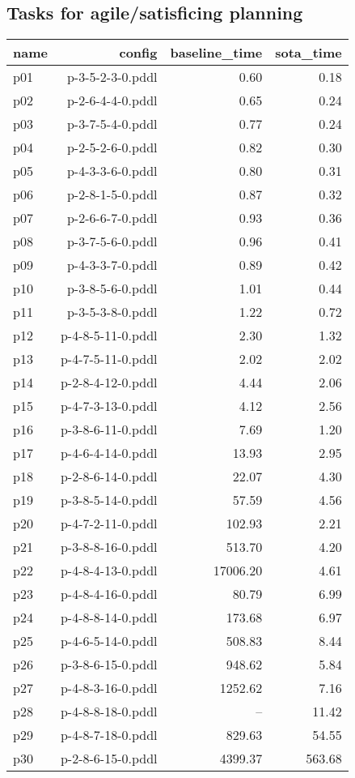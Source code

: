 \documentclass{article}
\begin{document}
                    \subsection*{Tasks for agile/satisficing planning}
                    
                            \begin{center}
                            \scriptsize
                            \begin{tabular}{@{}l|r|r|r@{}}
                            name & config & baseline\_time & sota\_time\\\midrule
                              p01& p-3-5-2-3-0.pddl&0.60&0.18\\
  p02& p-2-6-4-4-0.pddl&0.65&0.24\\
  p03& p-3-7-5-4-0.pddl&0.77&0.24\\
  p04& p-2-5-2-6-0.pddl&0.82&0.30\\
  p05& p-4-3-3-6-0.pddl&0.80&0.31\\
  p06& p-2-8-1-5-0.pddl&0.87&0.32\\
  p07& p-2-6-6-7-0.pddl&0.93&0.36\\
  p08& p-3-7-5-6-0.pddl&0.96&0.41\\
  p09& p-4-3-3-7-0.pddl&0.89&0.42\\
  p10& p-3-8-5-6-0.pddl&1.01&0.44\\
  p11& p-3-5-3-8-0.pddl&1.22&0.72\\
  p12& p-4-8-5-11-0.pddl&2.30&1.32\\
  p13& p-4-7-5-11-0.pddl&2.02&2.02\\
  p14& p-2-8-4-12-0.pddl&4.44&2.06\\
  p15& p-4-7-3-13-0.pddl&4.12&2.56\\
  p16& p-3-8-6-11-0.pddl&7.69&1.20\\
  p17& p-4-6-4-14-0.pddl&13.93&2.95\\
  p18& p-2-8-6-14-0.pddl&22.07&4.30\\
  p19& p-3-8-5-14-0.pddl&57.59&4.56\\
  p20& p-4-7-2-11-0.pddl&102.93&2.21\\
  p21& p-3-8-8-16-0.pddl&513.70&4.20\\
  p22& p-4-8-4-13-0.pddl&17006.20&4.61\\
  p23& p-4-8-4-16-0.pddl&80.79&6.99\\
  p24& p-4-8-8-14-0.pddl&173.68&6.97\\
  p25& p-4-6-5-14-0.pddl&508.83&8.44\\
  p26& p-3-8-6-15-0.pddl&948.62&5.84\\
  p27& p-4-8-3-16-0.pddl&1252.62&7.16\\
  p28& p-4-8-8-18-0.pddl&--&11.42\\
  p29& p-4-8-7-18-0.pddl&829.63&54.55\\
  p30& p-2-8-6-15-0.pddl&4399.37&563.68
                            \end{tabular}
                            \end{center}
                    
\end{document}
